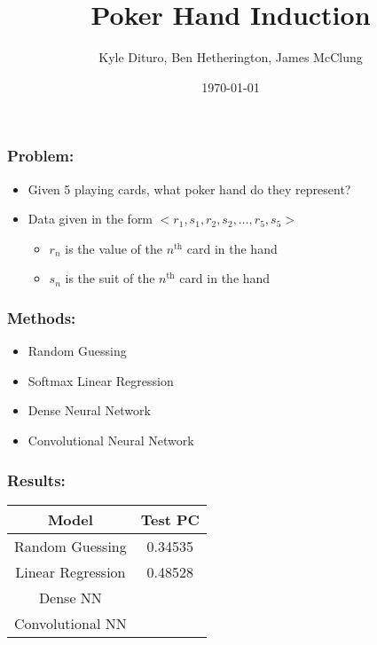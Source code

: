 \documentclass{beamer}
\title{Poker Hand Induction}
\author{Kyle Dituro, Ben Hetherington, James McClung}
\date{\today}
\begin{document}
    
    \begin{frame}
        \titlepage
    \end{frame}

    \begin{frame}[c]\frametitle{Problem:}
        \begin{itemize}
            \item Given 5 playing cards, what poker hand do they represent?
            \item Data given in the form $<r_1, s_1, r_2, s_2, \dots, r_5, s_5>$
            \begin{itemize}
                \item $r_n$ is the value of the $n^{\text{th}}$ card in the hand
                \item $s_n$ is the suit of the $n^{\text{th}}$ card in the hand
            \end{itemize}
        \end{itemize}
    \end{frame}

    \begin{frame}[c]\frametitle{Methods:}  
            \begin{itemize}
                \item Random Guessing
                \item Softmax Linear Regression
                \item Dense Neural Network
                \item Convolutional Neural Network
            \end{itemize}
    \end{frame}

    \begin{frame}[c]\frametitle{Results:}
        \begin{center}
            \begin{tabular}{|c|c|}
                \hline
                Model & Test PC 
                \\\hline
                Random Guessing & 0.34535 \\
                Linear Regression & 0.48528 \\
                Dense NN & \\
                Convolutional NN & \\
                \hline 
            \end{tabular}
        \end{center}
    \end{frame}
\end{document}
